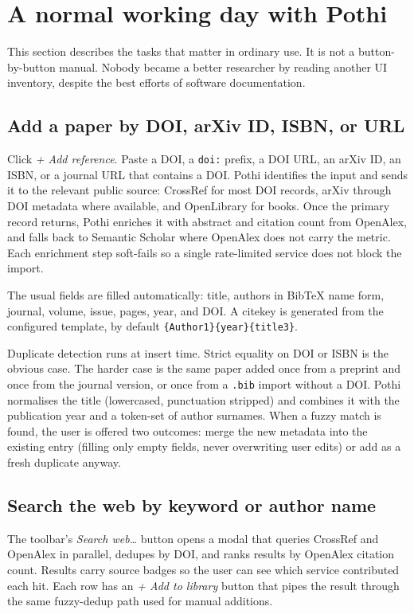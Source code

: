 \documentclass[10pt,twocolumn]{article}
\begin{document}
\section{A normal working day with Pothi}

This section describes the tasks that matter in ordinary use. It is not a button-by-button manual. Nobody became a better researcher by reading another UI inventory, despite the best efforts of software documentation.

\subsection{Add a paper by DOI, arXiv ID, ISBN, or URL}

Click \emph{+ Add reference}. Paste a DOI, a \texttt{doi:} prefix, a DOI URL, an arXiv ID, an ISBN, or a journal URL that contains a DOI. Pothi identifies the input and sends it to the relevant public source: CrossRef for most DOI records, arXiv through DOI metadata where available, and OpenLibrary for books. Once the primary record returns, Pothi enriches it with abstract and citation count from OpenAlex, and falls back to Semantic Scholar where Open\-Alex does not carry the metric. Each enrichment step soft-fails so a single rate-limited service does not block the import.

The usual fields are filled automatically: title, authors in BibTeX name form, journal, volume, issue, pages, year, and DOI. A citekey is generated from the configured template, by default \texttt{\{Author1\}\{year\}\{title3\}}.

Duplicate detection runs at insert time. Strict equality on DOI or ISBN is the obvious case. The harder case is the same paper added once from a preprint and once from the journal version, or once from a \texttt{.bib} import without a DOI. Pothi normalises the title (lowercased, punctuation stripped) and combines it with the publication year and a token-set of author surnames. When a fuzzy match is found, the user is offered two outcomes: merge the new metadata into the existing entry (filling only empty fields, never overwriting user edits) or add as a fresh duplicate anyway.

\subsection{Search the web by keyword or author name}

The toolbar's \emph{Search web\ldots} button opens a modal that queries CrossRef and OpenAlex in parallel, dedupes by DOI, and ranks results by OpenAlex citation count. Results carry source badges so the user can see which service contributed each hit. Each row has an \emph{+ Add to library} button that pipes the result through the same fuzzy-dedup path used for manual additions.
\end{document}

